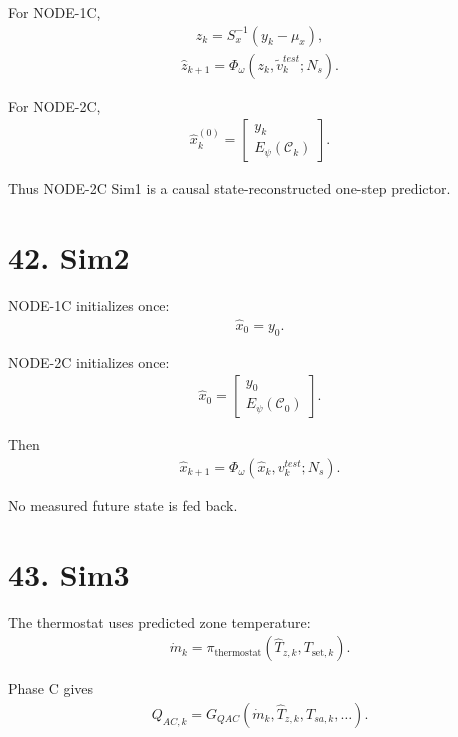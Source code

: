 \documentclass[11pt]{article}
\begin{document}
For NODE-1C,
\begin{align}
\boxed{
z_k=S_x^{-1}(y_k-\mu_x),
}
\tag{N3.140}
\end{align}
\begin{align}
\boxed{
\widehat z_{k+1}
=
\Phi_\omega(z_k,\widetilde v_k^{test};N_s).
}
\tag{N3.141}
\end{align}

For NODE-2C,
\begin{align}
\boxed{
\widehat x_k^{(0)}
=
\begin{bmatrix}
y_k\\
E_\psi(\mathcal C_k)
\end{bmatrix}.
}
\tag{N3.142}
\end{align}

Thus NODE-2C Sim1 is a causal state-reconstructed one-step predictor.

\section*{42. Sim2}

NODE-1C initializes once:
\begin{align}
\boxed{\widehat x_0=y_0.}
\tag{N3.143}
\end{align}

NODE-2C initializes once:
\begin{align}
\boxed{
\widehat x_0=
\begin{bmatrix}
y_0\\
E_\psi(\mathcal C_0)
\end{bmatrix}.
}
\tag{N3.144}
\end{align}

Then
\begin{align}
\boxed{
\widehat x_{k+1}
=
\Phi_\omega(\widehat x_k,v_k^{test};N_s).
}
\tag{N3.145}
\end{align}

No measured future state is fed back.

\section*{43. Sim3}

The thermostat uses predicted zone temperature:
\begin{align}
\boxed{
\dot m_k
=
\pi_{\mathrm{thermostat}}
(\widehat T_{z,k},T_{\mathrm{set},k}).
}
\tag{N3.146}
\end{align}

Phase C gives
\begin{align}
\boxed{
Q_{AC,k}
=
G_{QAC}
(\dot m_k,\widehat T_{z,k},T_{sa,k},\ldots).
}
\tag{N3.147}
\end{align}
\end{document}
